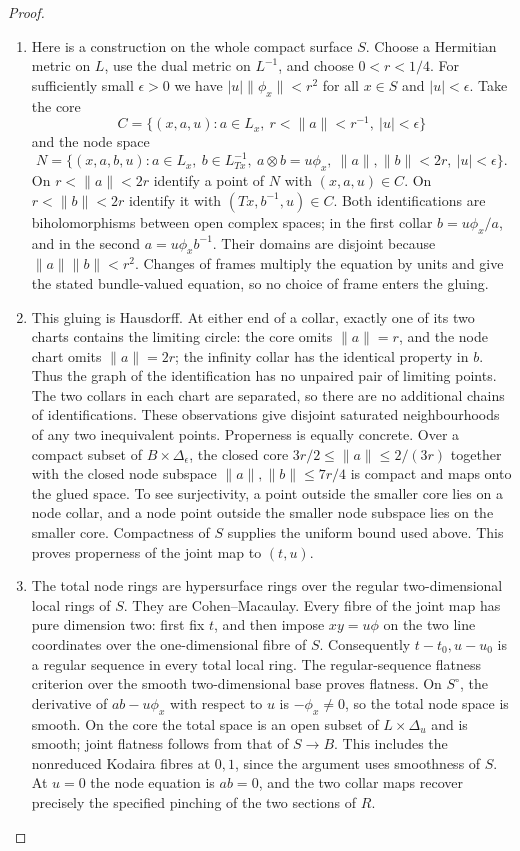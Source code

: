 \begin{proof}
\begin{enumerate}[label=\arabic*.,leftmargin=*]
\item Here is a construction on the whole compact surface $S$. Choose a
Hermitian metric on $L$, use the dual metric on $L^{-1}$, and choose
$0<r<1/4$. For sufficiently small $\epsilon>0$ we have
$|u|\|\phi_x\|<r^2$ for all $x\in S$ and $|u|<\epsilon$.
Take the core
\[
 C=\{(x,a,u):a\in L_x,\ r<\|a\|<r^{-1},\ |u|<\epsilon\}
\]
and the node space
\begin{equation}
 N=\{(x,a,b,u):a\in L_x,\ b\in L^{-1}_{Tx},\
 a\otimes b=u\phi_x,\ \|a\|,\|b\|<2r,\ |u|<\epsilon\}.
\label{pub:I:eq:E1}
\end{equation}
On $r<\|a\|<2r$ identify a point of $N$ with $(x,a,u)\in C$.
On $r<\|b\|<2r$ identify it with $(Tx,b^{-1},u)\in C$.
Both identifications are biholomorphisms between open complex spaces;
in the first collar $b=u\phi_x/a$, and in the second
$a=u\phi_xb^{-1}$. Their domains are disjoint because
$\|a\|\|b\|<r^2$. Changes of frames multiply the equation by
units and give the stated bundle-valued equation, so no choice of
frame enters the gluing.

\item This gluing is Hausdorff. At either end of a collar, exactly one
of its two charts contains the limiting circle: the core omits
$\|a\|=r$, and the node chart omits $\|a\|=2r$; the infinity
collar has the identical property in $b$. Thus the graph of the
identification has no unpaired pair of limiting points. The two
collars in each chart are separated, so there are no additional
chains of identifications. These observations give disjoint
saturated neighbourhoods of any two inequivalent points. Properness
is equally concrete. Over a compact subset of $B\times\Delta_\epsilon$,
the closed core $3r/2\leq\|a\|\leq2/(3r)$ together with the
closed node subspace $\|a\|,\|b\|\leq7r/4$ is compact and maps
onto the glued space. To see surjectivity, a point outside the smaller
core lies on a node collar, and a node point outside the smaller
node subspace lies on the smaller core. Compactness of $S$ supplies
the uniform bound used above. This proves properness of the joint
map to $(t,u)$.

\item The total node rings are hypersurface rings over the regular
two-dimensional local rings of $S$. They are Cohen--Macaulay.
Every fibre of the joint map has pure dimension two: first fix
$t$, and then impose $xy=u\phi$ on the two line coordinates over
the one-dimensional fibre of $S$. Consequently $t-t_0,u-u_0$ is a
regular sequence in every total local ring. The regular-sequence
flatness criterion over the smooth two-dimensional base proves
flatness. On $S^\circ$, the derivative of $ab-u\phi_x$ with respect to $u$ is $-\phi_x\ne0$, so the total node space is smooth. On the core the total space is an open subset of $L\times\Delta_u$
and is smooth; joint flatness follows from that of $S\to B$. This includes the nonreduced Kodaira fibres
at $0,1$, since the argument uses smoothness of $S$. At $u=0$ the node equation is $ab=0$,
and the two collar maps recover precisely the specified pinching
of the two sections of $R$.


\end{enumerate}
\end{proof}

